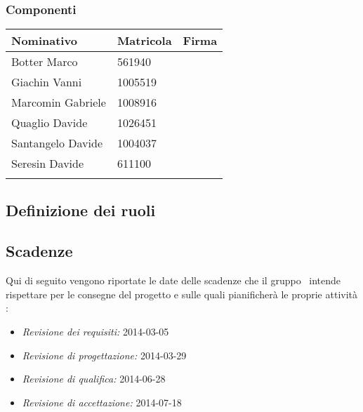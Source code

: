 \subsubsection{Componenti}
\begin{center}
\begin{tabular}{l l l}
\hline
Nominativo & Matricola & Firma\\
\hline
Botter Marco & 561940 & \\ %
\hline
Giachin Vanni & 1005519 & \\ %
\hline
Marcomin Gabriele & 1008916 & \\ %
\hline
Quaglio Davide & 1026451 &  \\ %
\hline
Santangelo Davide & 1004037 & \\ %
\hline
Seresin Davide & 611100 & \\ %
\hline
\\
\end{tabular}
\end{center}
\subsection{Definizione dei ruoli}

\subsection{Scadenze}
\label{subsec:Scadenze}
Qui di seguito vengono riportate le date delle scadenze che il gruppo \gruppo ~intende rispettare per le consegne del progetto e sulle quali pianificherà le proprie attività :
\begin{itemize}
	\item \textit{Revisione dei requisiti: }2014-03-05
	\item \textit{Revisione di progettazione: }2014-03-29
	\item \textit{Revisione di qualifica: }2014-06-28
	\item \textit{Revisione di accettazione: }2014-07-18
\end{itemize}
